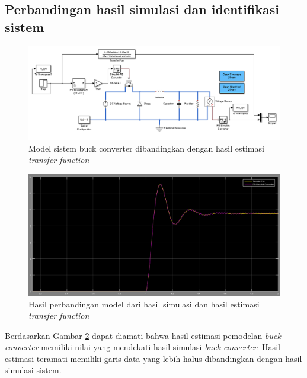 \documentclass[../main.tex]{subfiles}
\begin{document}
        \subsection{Perbandingan hasil simulasi dan identifikasi sistem}
            \begin{figure}[H]
                \centering
                \includegraphics[width = \textwidth]{assets/image/model_simulink_tf.png}
                \caption{Model sistem buck converter dibandingkan dengan hasil estimasi \textit{transfer function}}
                \label{model_simulink_tf}
            \end{figure}
            \begin{figure}[H]
                \centering
                \includegraphics[width = \textwidth]{assets/image/HASIL_PERBADINGAN_MODEL.png}
                \caption{Hasil perbandingan model dari hasil simulasi dan hasil estimasi \textit{transfer function}}
                \label{hasil_perbandingan}
            \end{figure}
            Berdasarkan Gambar \ref{hasil_perbandingan} dapat diamati bahwa hasil estimasi pemodelan \textit{buck converter} memiliki nilai yang mendekati hasil simulasi \textit{buck converter}. Hasil estimasi teramati memiliki garis data yang lebih halus dibandingkan dengan hasil simulasi sistem.
\end{document}
